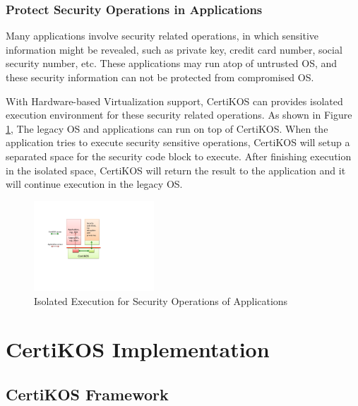 \documentclass[a4paper,12pt]{article}
\begin{document}
\subsubsection{Protect Security Operations in Applications}
Many applications involve security related operations, in which sensitive information might be revealed, such as private key, credit card number,  social security number, etc. These applications may run atop of untrusted OS, and these security information can not be protected from compromised OS.

With Hardware-based Virtualization support, CertiKOS can provides isolated execution environment for these security related operations.  As shown in Figure \ref{fig:sandbox}, The legacy OS and applications can run on top of CertiKOS.  When the application tries to execute security sensitive operations,  CertiKOS  will setup a separated space for the security code block to execute.  After finishing execution in the isolated space, CertiKOS will return the result to the application and it  will continue execution in the legacy OS.



\begin{figure}[!ht]
 \centerline{
 \includegraphics[width=0.4\textwidth]{certikos_sandbox}}
 \caption{Isolated Execution for Security Operations of Applications} \label{fig:sandbox}
\end{figure}

\section{CertiKOS Implementation}

\subsection{CertiKOS Framework}
\end{document}
